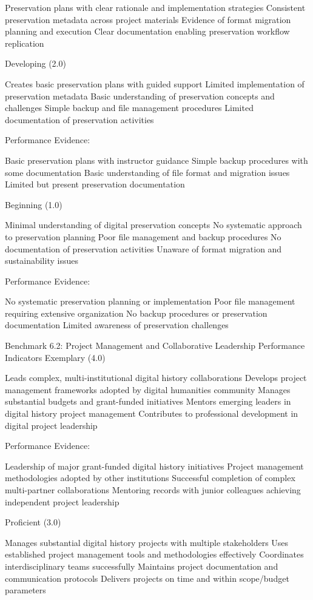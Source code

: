 \begin{appendices}
Preservation plans with clear rationale and implementation strategies
Consistent preservation metadata across project materials
Evidence of format migration planning and execution
Clear documentation enabling preservation workflow replication

Developing (2.0)

Creates basic preservation plans with guided support
Limited implementation of preservation metadata
Basic understanding of preservation concepts and challenges
Simple backup and file management procedures
Limited documentation of preservation activities

Performance Evidence:

Basic preservation plans with instructor guidance
Simple backup procedures with some documentation
Basic understanding of file format and migration issues
Limited but present preservation documentation

Beginning (1.0)

Minimal understanding of digital preservation concepts
No systematic approach to preservation planning
Poor file management and backup procedures
No documentation of preservation activities
Unaware of format migration and sustainability issues

Performance Evidence:

No systematic preservation planning or implementation
Poor file management requiring extensive organization
No backup procedures or preservation documentation
Limited awareness of preservation challenges

Benchmark 6.2: Project Management and Collaborative Leadership
Performance Indicators
Exemplary (4.0)

Leads complex, multi-institutional digital history collaborations
Develops project management frameworks adopted by digital humanities community
Manages substantial budgets and grant-funded initiatives
Mentors emerging leaders in digital history project management
Contributes to professional development in digital project leadership

Performance Evidence:

Leadership of major grant-funded digital history initiatives
Project management methodologies adopted by other institutions
Successful completion of complex multi-partner collaborations
Mentoring records with junior colleagues achieving independent project leadership

Proficient (3.0)

Manages substantial digital history projects with multiple stakeholders
Uses established project management tools and methodologies effectively
Coordinates interdisciplinary teams successfully
Maintains project documentation and communication protocols
Delivers projects on time and within scope/budget parameters


\end{appendices}
